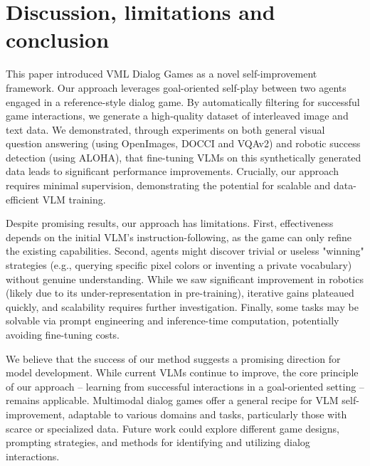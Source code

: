 \section{Discussion, limitations and conclusion}
\label{sec:conclusions}

This paper introduced VML Dialog Games as a novel self-improvement framework.
Our approach leverages goal-oriented self-play between two agents engaged in a reference-style dialog game. 
By automatically filtering for successful game interactions, we generate a high-quality dataset of interleaved image and text data.
We demonstrated, through experiments on both general visual question answering (using OpenImages, DOCCI and VQAv2) and robotic success detection (using ALOHA), that fine-tuning VLMs on this synthetically generated data leads to significant performance improvements. 
Crucially, our approach requires minimal supervision, demonstrating the potential for scalable and data-efficient VLM training.

Despite promising results, our approach has limitations.
First, effectiveness depends on the initial VLM's instruction-following, as the game can only refine the existing capabilities.
Second, agents might discover trivial or useless "winning" strategies (e.g., querying specific pixel colors or inventing a private vocabulary) without genuine understanding.
While we saw significant improvement in robotics (likely due to its under-representation in pre-training), iterative gains plateaued quickly, and scalability requires further investigation. Finally, some tasks may be solvable via prompt engineering and inference-time computation, potentially avoiding fine-tuning costs.

We believe that the success of our method suggests a promising direction for model development.
While current VLMs continue to improve, the core principle of our approach – learning from successful interactions in a goal-oriented setting – remains applicable. 
Multimodal dialog games offer a general recipe for VLM self-improvement, adaptable to various domains and tasks, particularly those with scarce or specialized data. 
Future work could explore different game designs, prompting strategies, and methods for identifying and utilizing dialog interactions.